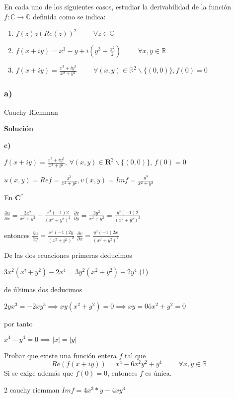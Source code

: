 \begin{ejer}
	En cada uno de los siguientes casos, estudiar la derivabilidad de la función $f:\mathbb{C} \rightarrow\mathbb{C}$ definida como se indica:
	\begin{enumerate}[label=(\alph*)]
		\item $f(z)  z(Re(z))^2 \hspace{1cm}\forall z\in\mathbb{C}$
		\item $f(x+iy) = x^3 -y+i\left( y^3 +\frac{x^2}{2} \right) \hspace{1cm} \forall x,y\in\mathbb{R}$
		\item $f(x+iy) = \frac{x^3+iy^3}{x^2+y^2} \hspace{1cm} \forall (x,y)\in\mathbb{R}^2\backslash\{(0,0)\}, f(0)=0$
	\end{enumerate}	
\end{ejer}

\subsubsection{a)}
Cauchy Riemman

\textbf{Solución}


\textbf{c)}

$f(x+iy) = \frac{x^3+iy^3}{x^2+y^2}$, $\forall (x,y)\in\mathbf{R}^2 \backslash \{ (0,0) \}$, $f(0)=0$

$u(x,y) = Re f = \frac{x^3}{x^2+y^2}, v(x,y) = Imf = \frac{y^3}{x^2+y^2}$

En $\mathbf{C}^{\ast}$

$ \frac{\partial u}{\partial x} = \frac{3x^2}{x^2+y^2} + \frac{x^4(-1)2}{(x^2+y^2)^2}$
$ \frac{\partial v}{\partial y} = \frac{3y^2}{x^2+y^2} = \frac{y^4(-1)2}{(x^2+y^2)^2}$

entonces
$\frac{\partial u}{\partial y} = \frac{x^3 (-1)2y}{(x^2+y^2)^2}$
$\frac{\partial v}{\partial x} = \frac{y^3(-1)2x}{(x^2+y^2)^2}$

De las dos ecuaciones primeras deducimos

$3x^2(x²+y^2) - 2x^4 = 3y^2(x^2+y^2)-2y^4$  (1)

de últimas dos deducimos

$2yx^3=-2xy^3 \implies xy(x^2+y^2) = 0 \implies xy=0 ó x^2+y^2=0$

por tanto

$x^4-y^4 = 0 \implies |x|=|y|$



\begin{ejer}
	Probar que existe una función entera $f$ tal que
	$$Re(f(x+iy)) = x^4-6x^2y^2+y^4 \hspace{1cm}\forall x,y\in\mathbb{R}$$
	Si se exige además que $f(0)=0$, entonces $f$ es única.
\end{ejer}
2 cauchy riemman
$Imf = 4x^3*y - 4xy^3$

